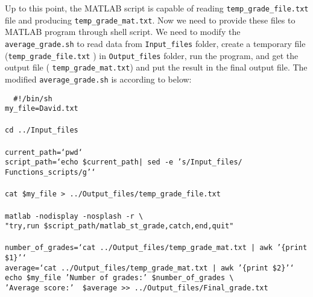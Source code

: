 Up to this point, the MATLAB script is capable of reading \texttt{temp\_grade\_file.txt} file and producing \texttt{temp\_grade\_mat.txt}. Now we need to provide these files to MATLAB program through shell script. We need to modify the \texttt{average\_grade.sh} to read data from \texttt{Input\_files} folder, create a temporary file (\texttt{temp\_grade\_file.txt} ) in \texttt{Output\_files} folder, run the program, and get the output file ( \texttt{temp\_grade\_mat.txt}) and put the result in the final output file. The modified \texttt{average\_grade.sh} is according to below:\\
\vspace{5mm}
 \begin{mdframed}[hidealllines=true,backgroundcolor=gray!20]
 \begin{singlespace}
 \fontsize{10pt}{1pt}
\texttt{
\noindent
{ \color{matlab_green} \#!/bin/sh} \\
my\_file=David.txt\\
\\
cd ../Input\_files\\ 
\\
current\_path={\color{red}`pwd`}\\
script\_path={\color{red}`echo \$current\_path| sed -e 's/Input\_files/ Functions\_scripts/g'`}\\
\\
cat \$my\_file > ../Output\_files/temp\_grade\_file.txt\\
\\
matlab -nodisplay -nosplash -r   \textbackslash \\
{\color{red}"try,run \$script\_path/matlab\_st\_grade,catch,end,quit"}\\
\\
number\_of\_grades={\color{red}`cat ../Output\_files/temp\_grade\_mat.txt | awk '\{print \$1\}'`}\\
average={\color{red}`cat ../Output\_files/temp\_grade\_mat.txt | awk '\{print \$2\}'`}\\
echo \$my\_file {\color{red}'Number of grades:'}  \$number\_of\_grades \textbackslash \\
\phantom{x}\hspace{14ex} {\color{red}'Average score:'} \  \$average >> ../Output\_files/Final\_grade.txt
 }
 \end{singlespace}
\end{mdframed}
\vspace{5mm}
\noindent
